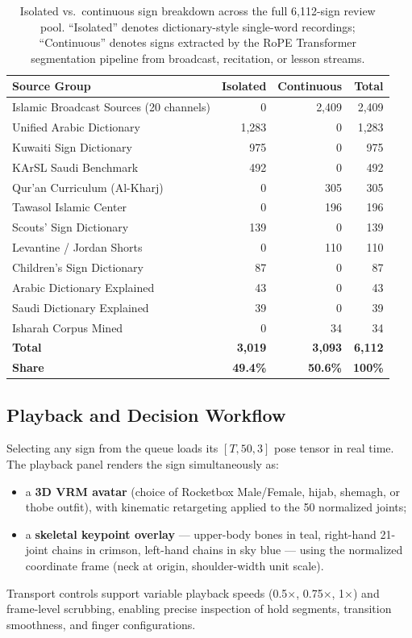 \begin{table}[ht]
\centering\small
\caption{Isolated vs.\ continuous sign breakdown across the full 6,112-sign review pool.
``Isolated'' denotes dictionary-style single-word recordings; ``Continuous'' denotes signs
extracted by the RoPE Transformer segmentation pipeline from broadcast, recitation, or lesson
streams.}
\label{tab:isolated_vs_continuous}
\begin{tabular}{l r r r}
\toprule
Source Group & Isolated & Continuous & Total \\
\midrule
Islamic Broadcast Sources (20 channels) & 0 & 2,409 & 2,409 \\
Unified Arabic Dictionary & 1,283 & 0 & 1,283 \\
Kuwaiti Sign Dictionary & 975 & 0 & 975 \\
KArSL Saudi Benchmark & 492 & 0 & 492 \\
Qur'an Curriculum (Al-Kharj) & 0 & 305 & 305 \\
Tawasol Islamic Center & 0 & 196 & 196 \\
Scouts' Sign Dictionary & 139 & 0 & 139 \\
Levantine / Jordan Shorts & 0 & 110 & 110 \\
Children's Sign Dictionary & 87 & 0 & 87 \\
Arabic Dictionary Explained & 43 & 0 & 43 \\
Saudi Dictionary Explained & 39 & 0 & 39 \\
Isharah Corpus Mined & 0 & 34 & 34 \\
\midrule
\textbf{Total} & \textbf{3,019} & \textbf{3,093} & \textbf{6,112} \\
\textbf{Share} & \textbf{49.4\%} & \textbf{50.6\%} & \textbf{100\%} \\
\bottomrule
\end{tabular}
\end{table}

\subsection{Playback and Decision Workflow}

Selecting any sign from the queue loads its $[T, 50, 3]$ pose tensor in real time.  The playback
panel renders the sign simultaneously as:
\begin{itemize}[leftmargin=*,itemsep=2pt]
  \item a \textbf{3D VRM avatar} (choice of Rocketbox Male/Female, hijab, shemagh, or thobe
    outfit), with kinematic retargeting applied to the 50 normalized joints;
  \item a \textbf{skeletal keypoint overlay} --- upper-body bones in teal, right-hand 21-joint
    chains in crimson, left-hand chains in sky blue --- using the normalized coordinate frame
    (neck at origin, shoulder-width unit scale).
\end{itemize}
Transport controls support variable playback speeds (0.5$\times$, 0.75$\times$, 1$\times$) and
frame-level scrubbing, enabling precise inspection of hold segments, transition smoothness, and
finger configurations.

